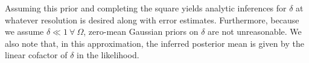 \documentclass{article}
\begin{document}
Assuming this prior and completing the square yields analytic inferences for $\delta$ at whatever resolution is desired along with error estimates.
Furthermore, because we assume $\delta \ll 1 \ \forall \ \Omega$, zero-mean Gaussian priors on $\delta$ are not unreasonable.
We also note that, in this approximation, the inferred posterior mean is given by the linear cofactor of $\delta$ in the likelihood.

\end{document}
